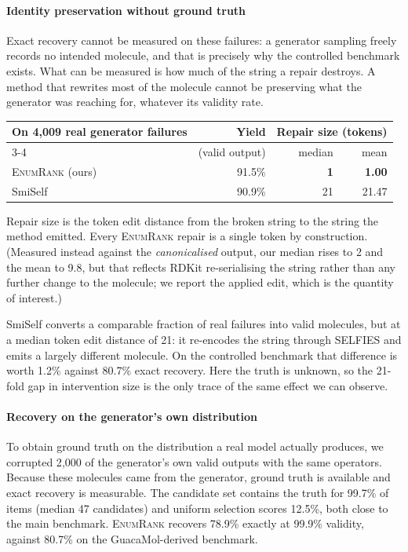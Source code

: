 \documentclass[conference]{IEEEtran}
\newcommand{\ours}{\textsc{EnumRank}}
\begin{document}
\paragraph{Identity preservation without ground truth}
Exact recovery cannot be measured on these failures: a generator sampling
freely records no intended molecule, and that is precisely why the controlled
benchmark exists. What can be measured is how much of the string a repair destroys. A
method that rewrites most of the molecule cannot be preserving what the
generator was reaching for, whatever its validity rate.

\begin{table}[t]
\centering\small
\begin{tabular}{lrrr}
\toprule
On 4{,}009 real generator failures & Yield & \multicolumn{2}{c}{Repair size (tokens)} \\
\cmidrule(l){3-4}
 & (valid output) & median & mean \\
\midrule
\ours{} (ours)              & 91.5\% & \textbf{1} & \textbf{1.00} \\
SmiSelf~\citep{smiself2025} & 90.9\% & 21 & 21.47 \\
\bottomrule
\end{tabular}
\end{table}

\noindent
Repair size is the token edit distance from the broken string to the string the
method emitted. Every \ours{} repair is a single token by construction.
(Measured instead against the \emph{canonicalised} output, our median rises to 2
and the mean to 9.8, but that reflects RDKit re-serialising the string rather
than any further change to the molecule; we report the applied edit, which is
the quantity of interest.)

SmiSelf converts a comparable fraction of real failures into valid molecules, but
at a median token edit distance of 21: it re-encodes the string through SELFIES
and emits a largely different molecule. On the controlled benchmark that
difference is worth 1.2\% against 80.7\% exact recovery. Here the truth is
unknown, so the 21-fold gap in intervention size is the only trace of the same
effect we can observe.

\paragraph{Recovery on the generator's own distribution}
To obtain ground truth on the distribution a real model actually produces, we
corrupted 2{,}000 of the generator's own valid outputs with the same operators.
Because these molecules came from the generator, ground truth is available and
exact recovery is measurable. The candidate set contains the truth for 99.7\% of
items (median 47 candidates) and uniform selection scores 12.5\%, both close to
the main benchmark. \ours{} recovers 78.9\% exactly at 99.9\% validity, against
80.7\% on the GuacaMol-derived benchmark.
\end{document}

